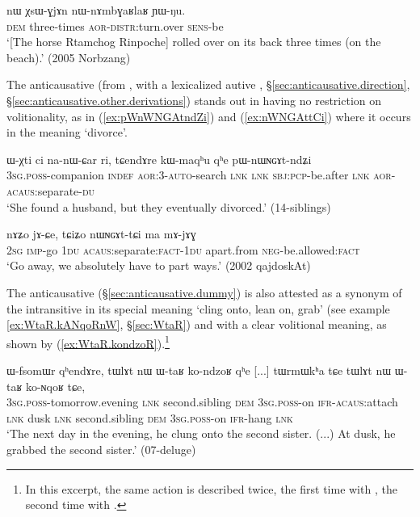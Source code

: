  \begin{exe}
\ex \label{ex:nWnAmbGaRlaR}
\gll  nɯ χsɯ-ɣjɤn nɯ-nɤmbɣaʁlaʁ ɲɯ-ŋu. \\ 
\textsc{dem} three-times  \textsc{aor}-\textsc{distr}:turn.over  \textsc{sens}-be \\
\glt  `[The horse Rtamchog Rinpoche] rolled over on its back three times (on the beach).' (2005 Norbzang)
\end{exe}

The anticausative  (from , with a lexicalized autive , §\ref{sec:anticausative.direction}, §\ref{sec:anticausative.other.derivations}) stands out in having no restriction on volitionality, as in (\ref{ex:pWnWNGAtndZi}) and (\ref{ex:nWNGAttCi}) where it occurs in the meaning `divorce'. 

\begin{exe}
\ex \label{ex:pWnWNGAtndZi}
\gll ɯ-χti ci na-nɯ-ɕar ri, tɕendɤre kɯ-maqʰu qʰe pɯ-nɯɴɢɤt-ndʑi \\
\textsc{3sg}.\textsc{poss}-companion \textsc{indef} \textsc{aor}:3\flobv{}-\textsc{auto}-search \textsc{lnk} \textsc{lnk} \textsc{sbj}:\textsc{pcp}-be.after \textsc{lnk} \textsc{aor}-\textsc{acaus}:separate-\textsc{du} \\
\glt `She found a husband, but they eventually divorced.' (14-siblings) 
\end{exe}

\begin{exe}
\ex \label{ex:nWNGAttCi}
\gll nɤʑo jɤ-ɕe, tɕiʑo nɯɴɢɤt-tɕi ma mɤ-jɤɣ \\
\textsc{2sg} \textsc{imp}-go \textsc{1du}  \textsc{acaus}:separate:\textsc{fact}-\textsc{1du} apart.from \textsc{neg}-be.allowed:\textsc{fact} \\
\glt `Go away, we absolutely have to part ways.' (2002 qajdoskAt)
\end{exe}

The anticausative  (§\ref{sec:anticausative.dummy}) is also attested as a synonym of the intransitive  in its special meaning `cling onto, lean on, grab' (see example \ref{ex:WtaR.kANqoRnW}, §\ref{sec:WtaR}) and with a clear volitional meaning, as shown by (\ref{ex:WtaR.kondzoR}).\footnote{In this excerpt, the same action is described twice, the first time with , the second time with .}
 
\begin{exe}
\ex \label{ex:WtaR.kondzoR}
\gll  ɯ-fsomɯr qʰendɤre, tɯlɤt nɯ ɯ-taʁ ko-ndzoʁ qʰe [...] tɯrmɯkʰa tɕe tɯlɤt nɯ ɯ-taʁ ko-ɴqoʁ tɕe, \\
\textsc{3sg}.\textsc{poss}-tomorrow.evening \textsc{lnk} second.sibling \textsc{dem} \textsc{3sg}.\textsc{poss}-on \textsc{ifr}-\textsc{acaus}:attach \textsc{lnk} { } dusk \textsc{lnk} second.sibling \textsc{dem} \textsc{3sg}.\textsc{poss}-on \textsc{ifr}-hang \textsc{lnk} \\
\glt `The next day in the evening, he clung onto the second sister. (...) At dusk, he grabbed the second sister.' (07-deluge)  
\end{exe}

